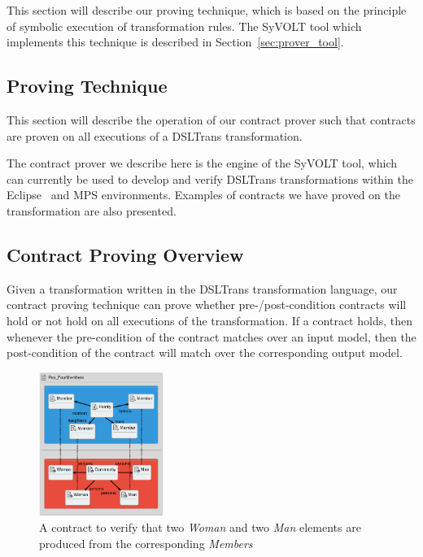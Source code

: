 This section will describe our proving technique, which is based on the principle of symbolic execution of transformation rules. The SyVOLT tool which implements this technique is described in Section~\ref{sec:prover_tool}.

\subsection{Proving Technique}
This section will describe the operation of our contract prover such that contracts are proven on all executions of a
DSLTrans transformation.

The contract prover we describe here is the engine of
the SyVOLT tool, which can currently be used to develop and verify DSLTrans transformations within the Eclipse~\cite{Lucio2015,syvoltTool,syvoltVideo} and MPS environments. Examples of contracts we have proved on the \FTP transformation are also presented.

\subsection{Contract Proving Overview}

Given a transformation written in the DSLTrans transformation language, our
contract proving technique can prove whether pre-\slash post-condition contracts will hold or
not hold on all executions of the transformation. If a contract holds, then whenever the pre-condition of the contract matches over an input model, then the post-condition of the contract will match over the corresponding output model.

  \begin{figure}[ht]
     \begin{center}
       \includegraphics[width=0.36\textwidth]{figures/FamToPersons/Pos_FourMembers.png}
       \caption{A contract to verify that two \emph{Woman} and two \emph{Man} elements are produced from the corresponding \emph{Members}}
       \label{fig:familyProp}
     \end{center}
     \vspace{-0.15in}
   \end{figure}

